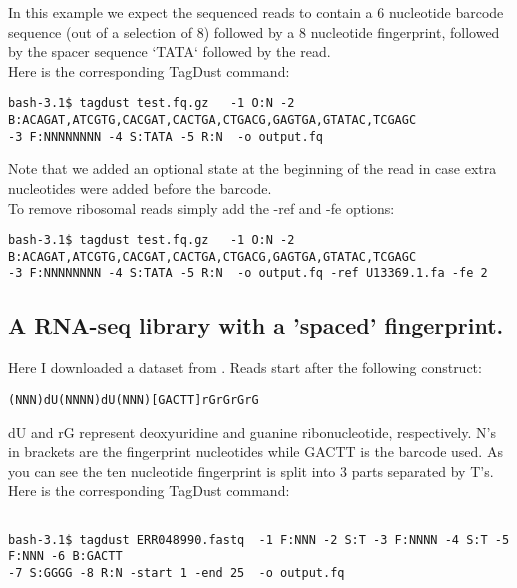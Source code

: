 \documentclass[11pt,a4paper,oneside]{book}
\begin{document}
In this example we expect the sequenced reads to contain a 6 nucleotide barcode sequence (out of a selection of 8) followed by a 8 nucleotide fingerprint, followed by the spacer sequence `TATA` followed by the read. \\

Here is the corresponding TagDust command: 


{\small
\begin{verbatim}
bash-3.1$ tagdust test.fq.gz   -1 O:N -2 B:ACAGAT,ATCGTG,CACGAT,CACTGA,CTGACG,GAGTGA,GTATAC,TCGAGC
-3 F:NNNNNNNN -4 S:TATA -5 R:N  -o output.fq
\end{verbatim}
}

Note that we added an optional state at the beginning of the read in case extra nucleotides were added before the barcode.  \\ 

To remove ribosomal reads simply add the -ref and -fe options:

{\small
\begin{verbatim}
bash-3.1$ tagdust test.fq.gz   -1 O:N -2 B:ACAGAT,ATCGTG,CACGAT,CACTGA,CTGACG,GAGTGA,GTATAC,TCGAGC
-3 F:NNNNNNNN -4 S:TATA -5 R:N  -o output.fq -ref U13369.1.fa -fe 2 
\end{verbatim}
}




\subsection{A RNA-seq library with a 'spaced' fingerprint.}

Here I downloaded a dataset from \cite{Kivioja:2012kg}. Reads start after the following construct:

{
\begin{verbatim}
(NNN)dU(NNNN)dU(NNN)[GACTT]rGrGrGrG
\end{verbatim}
}
dU and rG represent deoxyuridine and guanine ribonucleotide, respectively. N's in brackets are the fingerprint nucleotides while GACTT is the barcode used. As you can see the ten nucleotide fingerprint is split into 3 parts separated by T's. \\

Here is the corresponding TagDust command: 


{\small
\begin{verbatim}

bash-3.1$ tagdust ERR048990.fastq  -1 F:NNN -2 S:T -3 F:NNNN -4 S:T -5 F:NNN -6 B:GACTT
-7 S:GGGG -8 R:N -start 1 -end 25  -o output.fq
\end{verbatim}
}
\end{document}
